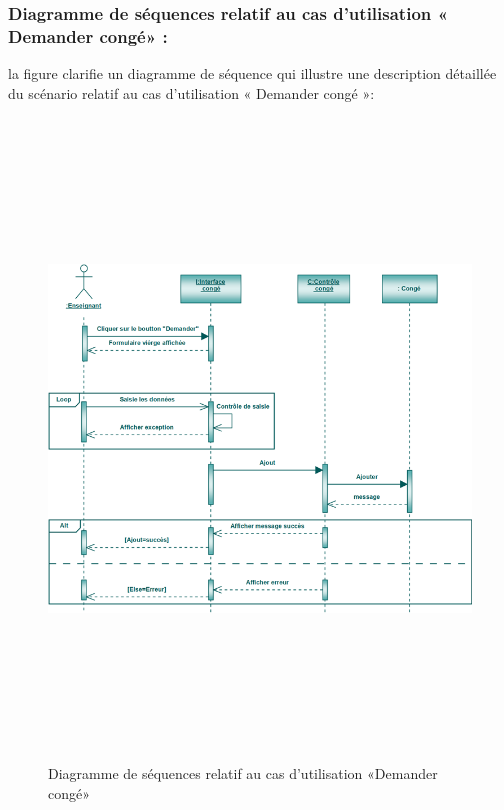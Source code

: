 \documentclass[12 pt ]{report}
\begin{document}
\subsubsection{Diagramme de séquences relatif au cas d’utilisation « Demander congé» :}
la figure   clarifie un diagramme de séquence qui illustre une description détaillée du scénario relatif au cas d’utilisation « Demander congé »: 
\begin{figure}[h]
 \begin{center}
\includegraphics[width= 18 cm ,height=  17cm]{sdc.PNG}
\caption{Diagramme de séquences relatif au cas d’utilisation «Demander congé»}

\end{center}
\end{figure}
\end{document}
